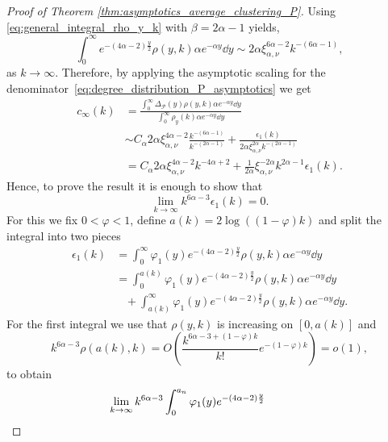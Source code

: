 \begin{proof}[Proof of Theorem \ref{thm:asymptotics_average_clustering_P}]
Using \eqref{eq:general_integral_rho_y_k} with $\beta = 2\alpha - 1$ yields,
\begin{equation}\label{eq:asymptotics_clustering_integral}
	\int_0^{\infty} e^{-(4\alpha - 2)\frac{y}{2}} \rho(y,k) \alpha e^{-\alpha y} \dd y 
	\sim 2\alpha \xi_{\alpha,\nu}^{6\alpha - 2} k^{-(6\alpha - 1)},
\end{equation}
as $k \to \infty$. Therefore, by applying the asymptotic scaling for the denominator~\eqref{eq:degree_distribution_P_asymptotics} we get
\begin{align*}
	c_\infty(k) &= \frac{\int_0^{\infty} \Delta_{\mathcal{P}}(y) \rho(y,k) \alpha  e^{-\alpha y} \dd y}
		{\int_0^\infty \rho_{y}(k) \alpha e^{-\alpha y} \dd y} \\
	&\sim C_\alpha 2\alpha \xi_{\alpha,\nu}^{4\alpha - 2} \frac{k^{-(6\alpha - 1)}}{k^{-(2\alpha - 1)}}
	+ \frac{\epsilon_1(k)}{2\alpha \xi_{\alpha,\nu}^{2\alpha} k^{-(2\alpha - 1)}}\\
	&= C_\alpha 2\alpha \xi_{\alpha,\nu}^{4\alpha - 2} k^{-4\alpha + 2} 
    + \frac{1}{2\alpha}\xi_{\alpha,\nu}^{-2\alpha} k^{2\alpha - 1}\epsilon_1(k).
\end{align*}
Hence, to prove the result it is enough to show that
\[
	\lim_{k \to \infty} k^{6\alpha - 3}\epsilon_1(k) = 0.
\]
For this we fix $0 < \varphi < 1$, define $a(k) = 2\log((1-\varphi)k)$  and split the integral into two pieces
\begin{align*}
	\epsilon_1(k) &= \int_0^{\infty} \varphi_1(y) e^{-(4\alpha - 2)\frac{y}{2}} \rho(y,k) \alpha e^{-\alpha y} \dd y\\
	&= \int_0^{a(k)} \varphi_1(y) e^{-(4\alpha - 2)\frac{y}{2}} \rho(y,k) \alpha e^{-\alpha y} \dd y\\
	&\hspace{10pt}+ \int_{a(k)}^{\infty} \varphi_1(y) e^{-(4\alpha - 2)\frac{y}{2}} 
    	\rho(y,k) \alpha e^{-\alpha y} \dd y.
\end{align*} 
For the first integral we use that $\rho(y,k)$ is increasing on $[0,a(k)]$  and
\[
	k^{6\alpha - 3}\rho(a(k),k) = O\left(\frac{k^{6\alpha - 3 + (1-\varphi)k}}{k!} e^{-(1-\varphi)k}\right) = o(1),
\]
to obtain
\begin{align*}
	&\hspace{-30pt}\lim_{k \to \infty} k^{6\alpha - 3} \int_0^{a_n} \varphi_1(y) e^{-(4\alpha - 2)\frac{y}{2}} 

\end{align*}
\end{proof}
